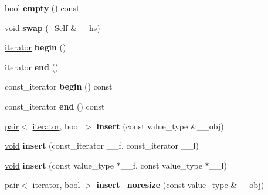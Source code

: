 \begin{DoxyCompactItemize}
\mbox{\label{classhash__set_af5e8ed62555633b2d33a5068249c2273}} 
bool {\bfseries empty} () const
\item 
\mbox{\label{classhash__set_abbc61f38d1019e17a89ccbfb14db0e59}} 
\hyperlink{interfacevoid}{void} {\bfseries swap} (\hyperlink{classhash__set}{\+\_\+\+Self} \&\+\_\+\+\_\+hs)
\item 
\mbox{\label{classhash__set_a9cf65420182266bb09677a89dc273a6b}} 
\hyperlink{structiterator}{iterator} {\bfseries begin} ()
\item 
\mbox{\label{classhash__set_a79f93790aa7855a7bf04d2a03ce5975e}} 
\hyperlink{structiterator}{iterator} {\bfseries end} ()
\item 
\mbox{\label{classhash__set_a3ec9f0755662b8d8608e4dcd68ba38b2}} 
const\+\_\+iterator {\bfseries begin} () const
\item 
\mbox{\label{classhash__set_ab5640c1c049151b5ed805a63e3646843}} 
const\+\_\+iterator {\bfseries end} () const
\item 
\mbox{\label{classhash__set_aafd8074855f5ef011f5ed7adc25a4f19}} 
\hyperlink{structpair}{pair}$<$ \hyperlink{structiterator}{iterator}, bool $>$ {\bfseries insert} (const value\+\_\+type \&\+\_\+\+\_\+obj)
\item 
\mbox{\label{classhash__set_a0583edbe2bb297237e44b3716bd7cb14}} 
\hyperlink{interfacevoid}{void} {\bfseries insert} (const\+\_\+iterator \+\_\+\+\_\+f, const\+\_\+iterator \+\_\+\+\_\+l)
\item 
\mbox{\label{classhash__set_ae1bb6b2c71efc9841adc2449fd8b6329}} 
\hyperlink{interfacevoid}{void} {\bfseries insert} (const value\+\_\+type $\ast$\+\_\+\+\_\+f, const value\+\_\+type $\ast$\+\_\+\+\_\+l)
\item 
\mbox{\label{classhash__set_adf0029e18a66dff90329269928a8e1ef}} 
\hyperlink{structpair}{pair}$<$ \hyperlink{structiterator}{iterator}, bool $>$ {\bfseries insert\+\_\+noresize} (const value\+\_\+type \&\+\_\+\+\_\+obj)
\item 

\end{DoxyCompactItemize}
